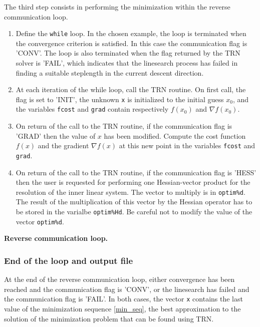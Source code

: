 \documentclass[a4paper,twoside,final,onecolumn,11pt,openright]{article}
\begin{document}
The third step consists in performing the minimization within the reverse communication loop. 
\begin{enumerate}
 \item Define the \texttt{while} loop. In the chosen example, the loop is terminated when the convergence criterion is satisfied. In this case the communication flag is 'CONV'. The loop is also terminated when the flag returned by the TRN solver is 'FAIL', which indicates that the linesearch process has failed in finding a suitable steplength in the current descent direction. 
 \item At each iteration of the while loop, call the TRN routine. On first call, the flag is set to 'INIT', the unknown \texttt{x} is initialized to the initial guess $x_0$, and the variables \texttt{fcost} and \texttt{grad} contain respectively $f(x_0)$ and $\nabla f(x_0)$.
\item On return of the call to the TRN routine, if the communication flag is 'GRAD' then the value of $x$ has been modified. Compute the cost function $f(x)$ and the gradient $\nabla f(x)$ at this new point in the variables \texttt{fcost} and \texttt{grad}.
\item On return of the call to the TRN routine, if the communication flag is 'HESS' then the user is requested for performing one Hessian-vector product for the resolution of the inner linear system. The vector to multiply is in \texttt{optim\%d}. The result of the multiplication of this vector by the Hessian operator has to be stored in the varialbe \texttt{optim\%Hd}. Be careful not to modify the value of the vector \texttt{optim\%d}.
\end{enumerate}

\framebox{
\small
 
}
\normalsize
\begin{center}
\textbf{Reverse communication loop.} 
\end{center}

\subsubsection{End of the loop and output file}
At the end of the reverse communication loop, either convergence has been reached and the communication flag is 'CONV', or the linesearch has failed and the communication flag is 'FAIL'. In both cases, the vector \texttt{x} contains the last value of the minimization sequence \eqref{min_seq}, the best approximation to the solution of the minimization problem that can be found using TRN. 
\end{document}

